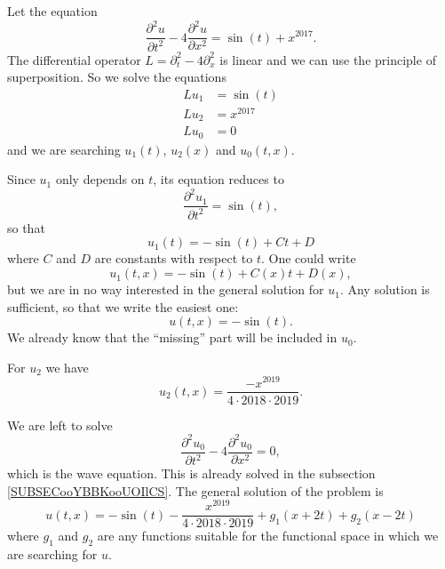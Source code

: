 \begin{example}
    Let the equation
    \begin{equation}
        \frac{ \partial^2u }{ \partial t^2 }-4\frac{ \partial^2u }{ \partial x^2 }=\sin(t)+x^{2017}.
    \end{equation}
    The differential operator \( L=\partial_t^2-4\partial_x^2\) is linear and we can use the principle of superposition. So we solve the equations
    \begin{subequations}
        \begin{align}
            Lu_1&=\sin(t)\\
            Lu_2&=x^{2017}\\
            Lu_0&=0
        \end{align}
    \end{subequations}
    and we are searching \( u_1(t)\), \( u_2(x)\) and \( u_0(t,x)\).

    Since \( u_1\) only depends on \( t\), its equation reduces to
    \begin{equation}
        \frac{ \partial^2u_1 }{ \partial t^2 }=\sin(t),   
    \end{equation}
    so that 
    \begin{equation}
        u_1(t)=-\sin(t)+Ct+D
    \end{equation}
    where \( C\) and \( D\) are constants with respect to \( t\). One could write
    \begin{equation}
        u_1(t,x)=-\sin(t)+C(x)t+D(x),
    \end{equation}
    but we are in no way interested in the general solution for \( u_1\). Any solution is sufficient, so that we write the easiest one:
    \begin{equation}
        u(t,x)=-\sin(t).
    \end{equation}
    We already know that the ``missing'' part will be included in \( u_0\).   

    For \( u_2\) we have
    \begin{equation}
        u_2(t,x)=\frac{ -x^{2019} }{ 4\cdot 2018\cdot 2019 }.
    \end{equation}
    
    We are left to solve
    \begin{equation}
        \frac{ \partial^2u_0 }{ \partial t^2 }-4\frac{ \partial^2u_0 }{ \partial x^2 }=0,
    \end{equation}
    which is the wave equation. This is already solved in the subsection \ref{SUBSECooYBBKooUOIlCS}. The general solution of the problem is
    \begin{equation}
        u(t,x)=-\sin(t)-\frac{ x^{2019} }{ 4\cdot 2018\cdot 2019 }+g_1(x+2t)+g_2(x-2t)
    \end{equation}
    where \( g_1\) and \( g_2\) are any functions suitable for the functional space in which we are searching for \( u\).
\end{example}

